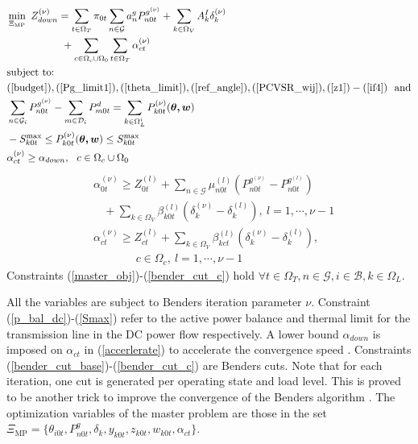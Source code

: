 \documentclass[journal]{IEEEtran}
\begin{document}
\begin{align}
&\min_{\Xi_{\text{MP}}}\ Z_{down}^{(\nu)}=\sum_{t\in \Omega_T}\pi_{0t}\sum_{n \in \mathcal{G}}{a^g_nP_{n0t}^{g^{(\nu)}}}+\sum_{k\in \Omega_V}A^I_k\delta_k^{(\nu)} \nonumber \\
&\ \ \ \ \ \ \ \ \ \ \ \ \ \ \ \  +\sum_{c \in \Omega_c\cup \Omega_0 }\sum_{t \in \Omega_T}\alpha_{ct}^{(\nu)}   \label{master_obj} \\
& \text{subject to:}    \nonumber  \\
&(\ref{budget}), (\ref{Pg_limit1}),(\ref{theta_limit}),(\ref{ref_angle}), (\ref{PCVSR_wij}), (\ref{z1})-(\ref{if4}) \ \ \text{and}  \nonumber \\
&\sum_{n \in \mathcal{G}_i}P^{g^{(\nu)}}_{n0t}-\sum_{m \in \mathcal{D}_i}P^d_{m0t}=\sum_{k\in \Omega_{L}^{i}} P^{(\nu)}_{k0t}(\bm{\theta,w}) \label{p_bal_dc}   \\
& -S_{k0t}^{\max} \le P^{(\nu)}_{k0t}(\bm{\theta,w}) \le S_{k0t}^{\max}  \label{Smax} \\
&\alpha_{ct}^{(\nu)} \ge \alpha_{down}, \ \ c \in \Omega_c \cup \Omega_0  \label{accerlerate}  
\end{align}
\begin{align} 
&\alpha_{0t}^{(\nu)} \ge Z^{(l)}_{0t}+\sum_{n\in \mathcal{G}}\mu_{n0t}^{(l)}(P_{n0t}^{g^{(\nu)}}-P_{n0t}^{g^{(l)}}) \nonumber\\
&\ \ \ \  +\sum_{k\in \Omega_V}\beta_{k0t}^{(l)}(\delta_k^{(\nu)}-\delta_k^{(l)}), \ l=1,\cdots,\nu-1  \label{bender_cut_base}  \\
&\alpha_{ct}^{(\nu)} \ge Z^{(l)}_{ct}+\sum_{k\in \Omega_V}\beta_{kct}^{(l)}(\delta_k^{(\nu)}-\delta_k^{(l)}), \nonumber \\
&\ \ \ \ \ \ \ \ \ \ \ \ \ \ \ \ \ c \in \Omega_c, \ l=1,\cdots,\nu-1  \label{bender_cut_c} 
\end{align}
Constraints (\ref{master_obj})-(\ref{bender_cut_c}) hold $\forall t \in \Omega_T, n\in \mathcal{G}, i\in \mathcal{B}, k \in \Omega_L$.

All the variables are subject to Benders iteration parameter $\nu$. Constraint (\ref{p_bal_dc})-(\ref{Smax}) refer to the active power balance and thermal limit for the transmission line in the DC power flow respectively. A lower bound $\alpha_{down}$ is imposed on $\alpha_{ct}$ in (\ref{accerlerate}) to accelerate the convergence speed \cite{mybibb:KTH_UC_uncertainty}. Constraints (\ref{bender_cut_base})-(\ref{bender_cut_c}) are Benders cuts. Note that for each iteration, one cut is generated per operating state and load level. This is proved to be another trick to improve the convergence of the Benders algorithm \cite{mybibb:multicut}. The optimization variables of the master problem are those in the set $\Xi_{\text{MP}}=\{\theta_{i0t},P^{g}_{n0t},\delta_k,y_{k0t},z_{k0t},w_{k0t},\alpha_{ct}\}$.
\end{document}
